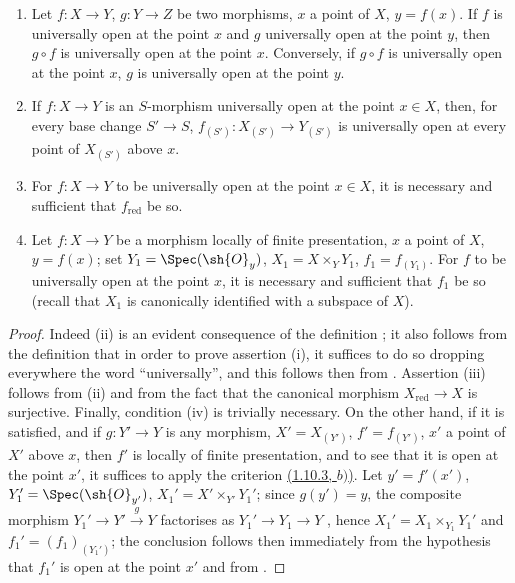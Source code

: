 \begin{proposition}[14.3.4]
\label{IV.14.3.4}
\begin{enumerate}[label=(\roman*)]
  \item Let $f:X\to Y$, $g:Y\to Z$ be two morphisms, $x$ a point of $X$, $y=f(x)$.
  If $f$ is universally open at the point $x$ and $g$ universally open at the point $y$, then $g\circ f$ is universally open at the point $x$.
  Conversely, if $g\circ f$ is universally open at the point $x$, $g$ is universally open at the point $y$.

  \item If $f:X\to Y$ is an $S$-morphism universally open at the point $x\in X$, then, for every base change $S'\to S$, $f_{(S')}:X_{(S')}\to Y_{(S')}$ is universally open at every point of $X_{(S')}$ above $x$.

  \item For $f:X\to Y$ to be universally open at the point $x\in X$, it is necessary and sufficient that $f_{\mathrm{red}}$ be so.

  \item Let $f:X\to Y$ be a morphism locally of finite presentation, $x$ a point of $X$, $y=f(x)$; set $Y_1=\Spec(\sh{O}_y)$, $X_1=X\times_Y Y_1$, $f_1=f_{(Y_1)}$.
  For $f$ to be universally open at the point $x$, it is necessary and sufficient that $f_1$ be so (recall  that $X_1$ is canonically identified with a subspace of $X$).
\end{enumerate}
\end{proposition}

\begin{proof}
Indeed (ii) is an evident consequence of the definition ; it also follows from the definition that in order to prove assertion (i), it suffices to do so dropping everywhere the word ``universally'', and this follows then from .
Assertion (iii) follows from (ii) and from the fact that the canonical morphism $X_{\mathrm{red}}\to X$ is surjective.
Finally, condition (iv) is trivially necessary.
On the other hand, if it is satisfied, and if $g:Y'\to Y$ is any morphism, $X'=X_{(Y')}$, $f'=f_{(Y')}$, $x'$ a point of $X'$ above $x$, then $f'$ is locally of finite presentation, and to see that it is open at the point $x'$, it suffices to apply the criterion {\hyperlink{ega4.c04.prop.1-10-3}{(1.10.3, $b)$)}}.
Let $y'=f'(x')$, $Y_1'=\Spec(\sh{O}_{y'})$, $X_1'=X'\times_{Y'}Y_1'$; since $g(y')=y$, the composite morphism $Y_1'\to Y'\xrightarrow{g}Y$ factorises as $Y_1'\to Y_1\to Y$ , hence $X_1'=X_1\times_{Y_1}Y_1'$ and $f_1'=(f_1)_{(Y_1')}$; the conclusion follows then immediately from the hypothesis that $f_1'$ is open at the point $x'$ and from .
\end{proof}

